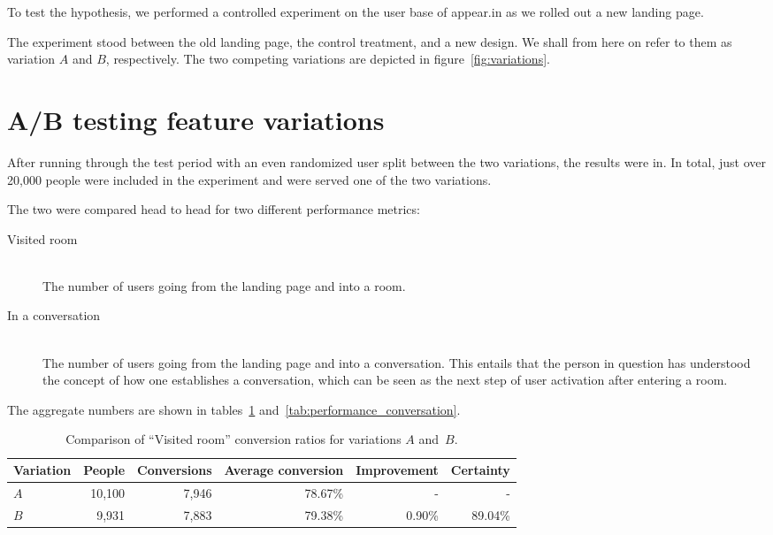 To test the hypothesis, we performed a controlled experiment on the user base of appear.in as we rolled out a new landing page.

The experiment stood between the old landing page, the control treatment, and a new design. We shall from here on refer to them as variation $A$ and $B$, respectively. The two competing variations are depicted in figure~\ref{fig:variations}.

\section{A/B testing feature variations}
\label{eval:sec:ab_testing_features}

After running through the test period with an even randomized user split between the two variations, the results were in. In total, just over 20,000 people were included in the experiment and were served one of the two variations.

The two were compared head to head for two different performance metrics:

\begin{description}
  \item[Visited room] \hfill \\
    The number of users going from the landing page and into a room.
  \item[In a conversation] \hfill \\
    The number of users going from the landing page and into a conversation. This entails that the person in question has understood the concept of how one establishes a conversation, which can be seen as the next step of user activation after entering a room.
\end{description}

The aggregate numbers are shown in tables~\ref{tab:performance_room} and~\ref{tab:performance_conversation}.

\begin{table}[h]
  \begin{tabular}{|l|r|r|r|r|r|}
    \hline
    Variation & People & Conversions & Average conversion & Improvement & Certainty \\ \hline
    $A$       & 10,100 & 7,946       & 78.67\%            & -           & -         \\ \hline
    $B$       &  9,931 & 7,883       & 79.38\%            & 0.90\%      & 89.04\%   \\ \hline
  \end{tabular}
  \caption{Comparison of ``Visited room'' conversion ratios for variations $A$ and~$B$.}
  \label{tab:performance_room}
\end{table}

